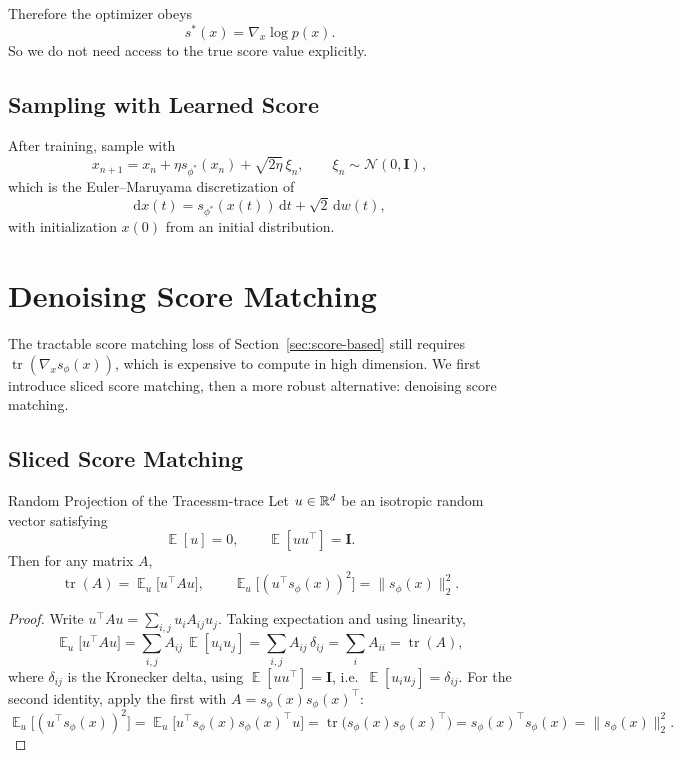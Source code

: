 \documentclass[11pt,a4paper]{article}
\renewcommand{\d}{\mathrm{d}}
\DeclareMathOperator*{\E}{\mathbb{E}}
\DeclareMathOperator{\tr}{tr}
\begin{document}
Therefore the optimizer obeys
\[
s^*(x)=\nabla_x\log p(x).
\]
So we do not need access to the true score value explicitly.

\subsection{Sampling with Learned Score}

After training, sample with
\[
x_{n+1}=x_n+\eta s_{\phi^*}(x_n)+\sqrt{2\eta}\,\xi_n,\qquad \xi_n\sim\mathcal{N}(0,\mathbf{I}),
\]
which is the Euler--Maruyama discretization of
\[
\d x(t)=s_{\phi^*}(x(t))\,\d t+\sqrt{2}\,\d w(t),
\]
with initialization $x(0)$ from an initial distribution.

\section{Denoising Score Matching}\label{sec:dsm}

The tractable score matching loss of Section~\ref{sec:score-based} still requires $\tr(\nabla_x s_{\phi}(x))$, which is expensive to compute in high dimension. We first introduce sliced score matching, then a more robust alternative: denoising score matching.

\subsection{Sliced Score Matching}\label{subsec:ssm}

\begin{fact}{Random Projection of the Trace}{ssm-trace}
Let $u\in\mathbb{R}^d$ be an isotropic random vector satisfying
\[
\E[u]=0,\qquad \E[uu^\top]=\mathbf{I}.
\]
Then for any matrix $A$,
\[
\tr(A)=\E_{u}\big[u^\top A u\big],
\qquad
\E_{u}\big[(u^\top s_{\phi}(x))^2\big]=\|s_{\phi}(x)\|_2^2.
\]
\end{fact}

\begin{proof}
Write $u^\top A u=\sum_{i,j}u_iA_{ij}u_j$. Taking expectation and using linearity,
\[
\E_u\big[u^\top Au\big]
=\sum_{i,j}A_{ij}\,\E[u_iu_j]
=\sum_{i,j}A_{ij}\,\delta_{ij}
=\sum_i A_{ii}=\tr(A),
\]
where $\delta_{ij}$ is the Kronecker delta, using $\E[uu^\top]=\mathbf{I}$, i.e.\ $\E[u_iu_j]=\delta_{ij}$.
For the second identity, apply the first with $A=s_{\phi}(x)s_{\phi}(x)^\top$:
\[
\E_u\big[(u^\top s_{\phi}(x))^2\big]
=\E_u\big[u^\top s_{\phi}(x)s_{\phi}(x)^\top u\big]
=\tr\!\big(s_{\phi}(x)s_{\phi}(x)^\top\big)
=s_{\phi}(x)^\top s_{\phi}(x)
=\|s_{\phi}(x)\|_2^2.
\]
\end{proof}
\end{document}
